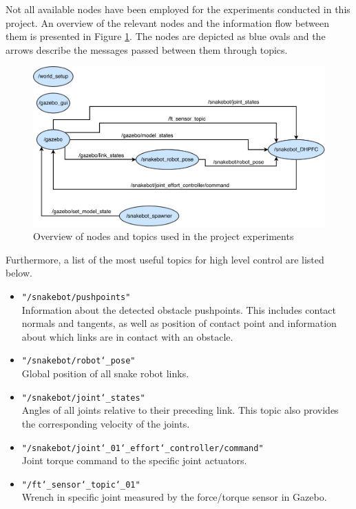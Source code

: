 Not all available nodes have been employed for the experiments conducted in this project. An overview of the relevant nodes and the information flow between them is presented in Figure \ref{fig:proj_nodes}. The nodes are depicted as blue ovals and the arrows describe the messages passed between them through topics.

\begin{figure}
    \centering
    \includegraphics[width=1\textwidth]{figures/simulator/proj_nodes.pdf}
    \caption{Overview of nodes and topics used in the project experiments}
    \label{fig:proj_nodes}
\end{figure}

Furthermore, a list of the most useful topics for high level control are listed below.

\begin{itemize}
    \item \texttt{"/snakebot/pushpoints"}\\
    Information about the detected obstacle pushpoints. This includes contact normals and tangents, as well as position of contact point and information about which links are in contact with an obstacle.
    
    \item \texttt{"/snakebot/robot\char`_pose"}\\
    Global position of all snake robot links.
    
    \item \texttt{"/snakebot/joint\char`_states"}\\
    Angles of all joints relative to their preceding link. This topic also provides the corresponding velocity of the joints.
    
    \item \texttt{"/snakebot/joint\char`_01\char`_effort\char`_controller/command"}\\
    Joint torque command to the specific joint actuators.
    
    \item \texttt{"/ft\char`_sensor\char`_topic\char`_01"}\\
    Wrench in specific joint measured by the force/torque sensor in Gazebo.
\end{itemize}